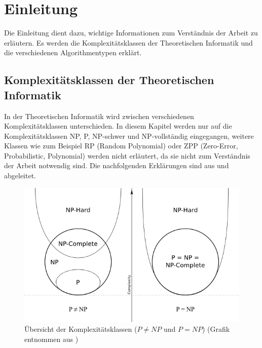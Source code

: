 %
%

\chapter{Einleitung}\label{chap.einleitung}
Die Einleitung dient dazu, wichtige Informationen zum Verständnis der Arbeit zu erläutern. Es werden die Komplexitätsklassen der Theoretischen Informatik und die verschiedenen Algorithmentypen erklärt.

\section{Komplexitätsklassen der Theoretischen Informatik}\label{cat_theo_inf}
In der Theoretischen Informatik wird zwischen verschiedenen Komplexitätsklassen unterschieden. In diesem Kapitel werden nur auf die Komplexitätsklassen NP, P, NP-schwer und NP-vollständig eingegangen, weitere Klassen wie zum Beispiel RP (Random Polynomial) oder ZPP (Zero-Error, Probabilistic, Polynomial) werden nicht erläutert, da sie nicht zum Verständnis der Arbeit notwendig sind. Die nachfolgenden Erklärungen sind aus \cite{hopcroft2011einfuehrung} und \cite{slides_p_np} abgeleitet.

\begin{figure}[h]
\includegraphics[scale=0.7]{images/einleitung/p_np_np-complete_np-hard.png}
\caption[Übersicht der Komplexitätsklassen ($P!=NP$ und $P=NP$)]{Übersicht der Komplexitätsklassen ($P \neq NP$ und $P=NP$) (Grafik entnommen aus \cite{pic_p_np})}
\label{fig:complexity_overview}
\end{figure}


